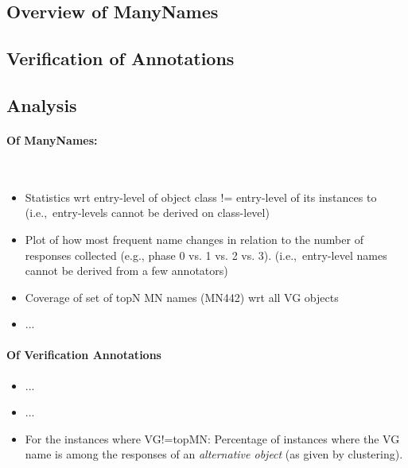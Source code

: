 

\subsection{Overview of ManyNames}
\label{sect:mn_overview}

\subsection{Verification of Annotations}
\label{sect:mn_verification}

\subsection{Analysis}
\label{sect:mn_analysis}
\paragraph{Of ManyNames:} 
\\
\begin{itemize}
	\item Statistics wrt entry-level of object class != entry-level of its instances to (i.e.,\ entry-levels cannot be derived on class-level)
	\item Plot of how most frequent name changes in relation to the number of responses collected (e.g., phase 0 vs. 1 vs. 2 vs. 3). (i.e.,\ entry-level names cannot be derived from a few annotators)
	\item Coverage of set of topN MN names (MN442) wrt all VG objects 
	\item ...
\end{itemize}


\paragraph{Of Verification Annotations}
\begin{itemize}
	\item ...
	\item ...
	\item For the instances where VG!=topMN: Percentage of instances where the VG name is among the responses of an \textit{alternative object} (as given by clustering).
\end{itemize}

